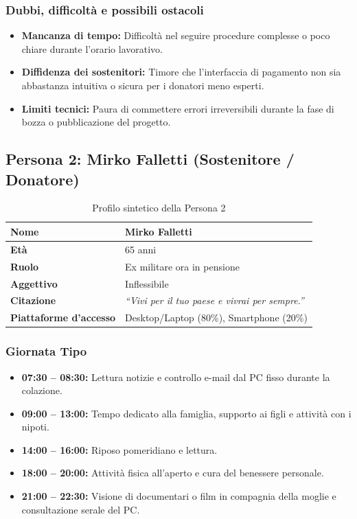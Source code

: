 \documentclass[11pt,a4paper]{article}
\begin{document}
\subsubsection{Dubbi, difficoltà e possibili ostacoli}
\begin{itemize}
    \item \textbf{Mancanza di tempo:} Difficoltà nel seguire procedure complesse o poco chiare durante l'orario lavorativo.
    \item \textbf{Diffidenza dei sostenitori:} Timore che l'interfaccia di pagamento non sia abbastanza intuitiva o sicura per i donatori meno esperti.
    \item \textbf{Limiti tecnici:} Paura di commettere errori irreversibili durante la fase di bozza o pubblicazione del progetto.
\end{itemize}


\subsection{Persona 2: Mirko Falletti (Sostenitore / Donatore)}

\begin{table}[h!]
\centering
\small
\begin{tabular}{|p{3.5cm}|p{11.5cm}|}
\hline
\textbf{Nome} & Mirko Falletti \\ \hline
\textbf{Età} & 65 anni \\ \hline
\textbf{Ruolo} & Ex militare ora in pensione \\ \hline
\textbf{Aggettivo} & Inflessibile \\ \hline
\textbf{Citazione} & \textit{``Vivi per il tuo paese e vivrai per sempre.''} \\ \hline
\textbf{Piattaforme d'accesso} & Desktop/Laptop (80\%), Smartphone (20\%) \\ \hline
\end{tabular}
\caption{Profilo sintetico della Persona 2}
\label{tab:persona2}
\end{table}

\subsubsection{Giornata Tipo}
\begin{itemize}
    \item \textbf{07:30 -- 08:30:} Lettura notizie e controllo e-mail dal PC fisso durante la colazione.
    \item \textbf{09:00 -- 13:00:} Tempo dedicato alla famiglia, supporto ai figli e attività con i nipoti.
    \item \textbf{14:00 -- 16:00:} Riposo pomeridiano e lettura.
    \item \textbf{18:00 -- 20:00:} Attività fisica all'aperto e cura del benessere personale.
    \item \textbf{21:00 -- 22:30:} Visione di documentari o film in compagnia della moglie e consultazione serale del PC.
\end{itemize}
\end{document}
